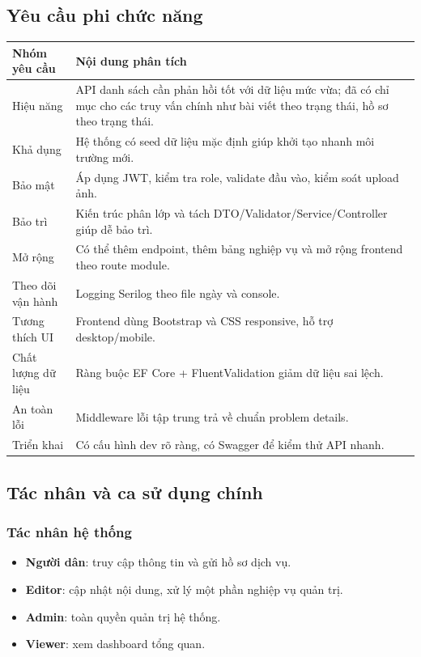 \documentclass[12pt,a4paper]{article}
\begin{document}
\subsection{Yêu cầu phi chức năng}
\begin{longtable}{p{3.1cm}p{10.6cm}}
\toprule
\textbf{Nhóm yêu cầu} & \textbf{Nội dung phân tích} \\
\midrule
Hiệu năng & API danh sách cần phản hồi tốt với dữ liệu mức vừa; đã có chỉ mục cho các truy vấn chính như bài viết theo trạng thái, hồ sơ theo trạng thái. \\
Khả dụng & Hệ thống có seed dữ liệu mặc định giúp khởi tạo nhanh môi trường mới. \\
Bảo mật & Áp dụng JWT, kiểm tra role, validate đầu vào, kiểm soát upload ảnh. \\
Bảo trì & Kiến trúc phân lớp và tách DTO/Validator/Service/Controller giúp dễ bảo trì. \\
Mở rộng & Có thể thêm endpoint, thêm bảng nghiệp vụ và mở rộng frontend theo route module. \\
Theo dõi vận hành & Logging Serilog theo file ngày và console. \\
Tương thích UI & Frontend dùng Bootstrap và CSS responsive, hỗ trợ desktop/mobile. \\
Chất lượng dữ liệu & Ràng buộc EF Core + FluentValidation giảm dữ liệu sai lệch. \\
An toàn lỗi & Middleware lỗi tập trung trả về chuẩn problem details. \\
Triển khai & Có cấu hình dev rõ ràng, có Swagger để kiểm thử API nhanh. \\
\bottomrule
\end{longtable}

\subsection{Tác nhân và ca sử dụng chính}
\subsubsection{Tác nhân hệ thống}
\begin{itemize}[leftmargin=1.1cm]
  \item \textbf{Người dân}: truy cập thông tin và gửi hồ sơ dịch vụ.
  \item \textbf{Editor}: cập nhật nội dung, xử lý một phần nghiệp vụ quản trị.
  \item \textbf{Admin}: toàn quyền quản trị hệ thống.
  \item \textbf{Viewer}: xem dashboard tổng quan.
\end{itemize}
\end{document}
